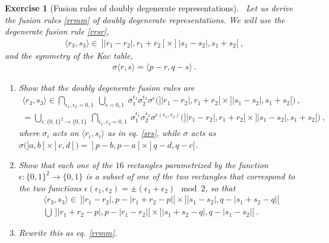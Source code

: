 \documentclass[12pt, a4paper, notitlepage, twoside]{report}
\numberwithin{equation}{section}
\theoremstyle{break}
\newtheorem{exo}{Exercise}[chapter]
\begin{document}
\begin{exo}[Fusion rules of doubly degenerate representations]
 ~\label{exofus}
Let us derive the fusion rules \eqref{rrmm} of doubly degenerate representations.
We will use the degenerate fusion rule \eqref{rrsr}, 
\begin{align}
\langle r_3, s_3\rangle\in\ ]|r_1-r_2|,r_1+r_2[ \times ]|s_1-s_2|,s_1+s_2[ \ ,
\end{align}
and the symmetry of the Kac table,
\begin{align}
 \sigma\langle r,s \rangle = \langle p-r,q-s\rangle\ .
\label{srs}
\end{align}
\begin{enumerate}
 \item Show that the doubly degenerate fusion rules are
\begin{multline}
\langle r_3, s_3\rangle \in \bigcap_{\epsilon_1,\epsilon_2 = 0,1}\ \bigcup_{\epsilon=0,1} \ \sigma_1^{\epsilon_1} \sigma_2^{\epsilon_2} \sigma^{\epsilon}
\Big( \big]|r_1-r_2|,r_1+r_2\big[ \times \big]|s_1-s_2|,s_1+s_2\big[  \Big)\ ,
\\
 = \bigcup_{\epsilon:\{0,1\}^2 \to \{0,1\} }\ \bigcap_{\epsilon_1,\epsilon_2=0,1} \ \sigma_1^{\epsilon_1} \sigma_2^{\epsilon_2} \sigma^{\epsilon(\epsilon_1,\epsilon_2)} \Big( \big]|r_1-r_2|,r_1+r_2\big[ \times \big]|s_1-s_2|,s_1+s_2\big[  \Big)\ ,
\end{multline}
where $\sigma_i$ acts on $\langle r_i,s_i\rangle$ as in eq. \eqref{srs}, while $\sigma$ acts as $\sigma\big(]a,b[\times]c,d[\big) = ]p-b,p-a[\times ]q-d,q-c[$.
\item
Show that each one of the $16$ rectangles parametrized by the function $\epsilon:\{0,1\}^2 \to \{0,1\} $ is a subset of one of the two rectangles that correspond to the two functions $\epsilon(\epsilon_1,\epsilon_2)=\pm (\epsilon_1+\epsilon_2) \mod 2$, so that 
\begin{multline}
 \langle r_3, s_3\rangle  \in\  \big]|r_1-r_2|,p-|r_1+r_2-p|\big[\times \big]|s_1-s_2|,q-|s_1+s_2-q|\big[ 
\\
 \bigcup\ \big]|r_1+r_2-p|,p-|r_1-r_2|\big[\times \big]|s_1+s_2-q|,q-|s_1-s_2|\big[\ .
\end{multline}
\item Rewrite this as eq. \eqref{rrmm}.
\end{enumerate}
\end{exo}
\end{document}
